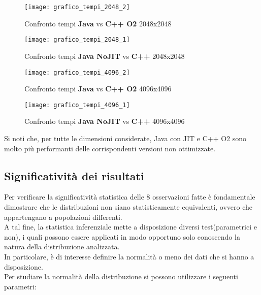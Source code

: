 \begin{figure}[!htbp]
  \texttt{[image: grafico\_tempi\_2048\_2]}
  \caption{Confronto tempi \textbf{Java} vs \textbf{C++ O2} 2048x2048}
  \label{grafico_tempi_2048_2}
\end{figure}

\clearpage

\begin{figure}[!htbp]
  \texttt{[image: grafico\_tempi\_2048\_1]}
  \caption{Confronto tempi \textbf{Java NoJIT} vs \textbf{C++} 2048x2048}
  \label{grafico_tempi_2048_1}
\end{figure}

\begin{figure}[!htbp]
  \texttt{[image: grafico\_tempi\_4096\_2]}
  \caption{Confronto tempi \textbf{Java} vs \textbf{C++ O2} 4096x4096}
  \label{grafico_tempi_4096_2}
\end{figure}

\begin{figure}[!htbp]
  \texttt{[image: grafico\_tempi\_4096\_1]}
  \caption{Confronto tempi \textbf{Java NoJIT} vs \textbf{C++} 4096x4096}
  \label{grafico_tempi_4096_1}
\end{figure}

Si noti che, per tutte le dimensioni considerate, Java con JIT e C++ O2 sono
molto più performanti delle corrispondenti versioni non ottimizzate.\\

\subsection{Significatività dei risultati}

Per verificare la significatività statistica delle 8 osservazioni fatte è fondamentale
dimostrare che le distribuzioni non siano statisticamente equivalenti, ovvero che
appartengano a popolazioni differenti.\\
A tal fine, la statistica inferenziale mette a disposizione diversi test(parametrici e non),
i quali possono essere applicati in modo opportuno solo conoscendo la natura
della distribuzione analizzata.\\
In particolare, è di interesse definire la normalità o meno dei dati che si hanno
a disposizione.\\
Per studiare la normalità della distribuzione si possono utilizzare i seguenti
parametri:

